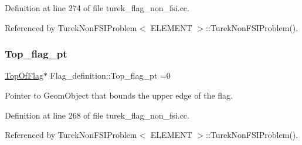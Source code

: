 Definition at line 274 of file turek\+\_\+flag\+\_\+non\+\_\+fsi.\+cc.



Referenced by Turek\+Non\+F\+S\+I\+Problem$<$ E\+L\+E\+M\+E\+N\+T $>$\+::\+Turek\+Non\+F\+S\+I\+Problem().

\mbox{\label{namespaceFlag__definition_af602ebeb0c40d05d00961af07bf3e842}} 
\subsubsection{\texorpdfstring{Top\+\_\+flag\+\_\+pt}{Top\_flag\_pt}}
{\footnotesize\ttfamily \hyperlink{classFlag__definition_1_1TopOfFlag}{Top\+Of\+Flag}$\ast$ Flag\+\_\+definition\+::\+Top\+\_\+flag\+\_\+pt =0}



Pointer to Geom\+Object that bounds the upper edge of the flag. 



Definition at line 268 of file turek\+\_\+flag\+\_\+non\+\_\+fsi.\+cc.



Referenced by Turek\+Non\+F\+S\+I\+Problem$<$ E\+L\+E\+M\+E\+N\+T $>$\+::\+Turek\+Non\+F\+S\+I\+Problem().

